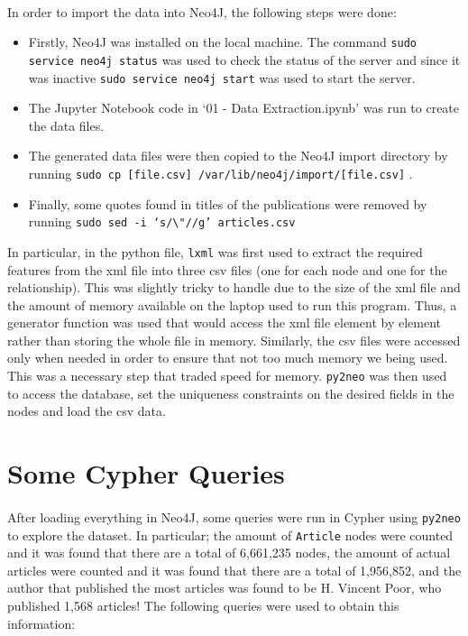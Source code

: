 \paragraph{ }In order to import the data into Neo4J, the following steps were done:
\begin{itemize}
	\item Firstly, Neo4J was installed on the local machine. The command \texttt{sudo service neo4j status} was used to check the status of the server and since it was inactive \texttt{sudo service neo4j start} was used to start the server.
	\item The Jupyter Notebook code in `01 - Data Extraction.ipynb' was run to create the data files.
	\item The generated data files were then copied to the Neo4J import directory by running \texttt{sudo cp [file.csv] /var/lib/neo4j/import/[file.csv]} .
	\item Finally, some quotes found in titles of the publications were removed by running \texttt{sudo sed -i `s/\textbackslash"//g' articles.csv}
\end{itemize}
In particular, in the python file, \texttt{lxml} was first used to extract the required features from the xml file into three csv files (one for each node and one for the relationship). This was slightly tricky to handle due to the size of the xml file and the amount of memory available on the laptop used to run this program. Thus, a generator function was used that would access the xml file element by element rather than storing the whole file in memory. Similarly, the csv files were accessed only when needed in order to ensure that not too much memory we being used. This was a necessary step that traded speed for memory. \texttt{py2neo} was then used to access the database, set the uniqueness constraints on the desired fields in the nodes and load the csv data.

\section{Some Cypher Queries}
\paragraph{ }After loading everything in Neo4J, some queries were run in Cypher using \texttt{py2neo} to explore the dataset. In particular; the amount of \texttt{Article} nodes were counted and it was found that there are a total of 6,661,235 nodes, the amount of actual articles were counted and it was found that there are a total of 1,956,852, and the author that published the most articles was found to be H. Vincent Poor, who published 1,568 articles! The following queries were used to obtain this information:\\

